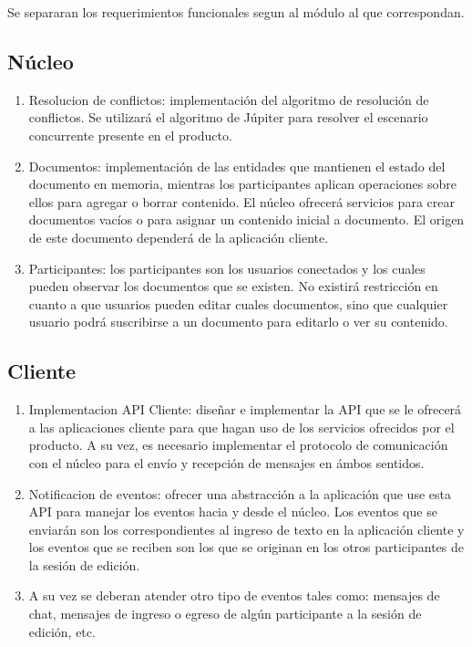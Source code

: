 \documentclass[12pt,a4paper]{article}
\begin{document}
	Se separaran los requerimientos funcionales segun al módulo al que correspondan.

	\subsection{Núcleo}
	\begin{enumerate}
	\item Resolucion de conflictos: implementación del algoritmo de resolución de conflictos. Se utilizará el algoritmo de Júpiter \cite{jupiter} para resolver el escenario concurrente presente en el producto.
	\item Documentos: implementación de las entidades que mantienen el estado del documento en memoria, mientras los participantes aplican operaciones sobre ellos para agregar o borrar contenido. El núcleo ofrecerá servicios para crear documentos vacíos o para asignar un contenido inicial a documento. El origen de este documento dependerá de la aplicación cliente.
	\item Participantes: los participantes son los usuarios conectados y los cuales pueden observar los documentos que se existen. No existirá restricción en cuanto a que usuarios pueden editar cuales documentos, sino que cualquier usuario podrá suscribirse a un documento para editarlo o ver su contenido.
	
	\end{enumerate}


	\subsection{Cliente}

	\begin{enumerate}
\item Implementacion API Cliente: diseñar e implementar la API que se le ofrecerá a las aplicaciones cliente para que hagan uso de los servicios ofrecidos por el producto.
A su vez, es necesario implementar el protocolo de comunicación con el núcleo para el envío y recepción de mensajes en ámbos sentidos.

\item Notificacion de eventos: ofrecer una abstracción a la aplicación que use esta API para manejar los eventos hacia y desde el núcleo. Los eventos que se enviarán son los correspondientes al ingreso de texto en la aplicación cliente y los eventos que se reciben son los que se originan en los otros participantes de la sesión de edición.

\item A su vez se deberan atender otro tipo de eventos tales como: mensajes de chat, mensajes de ingreso o egreso de algún participante a la sesión de edición, etc.
	\end{enumerate}
\end{document}
